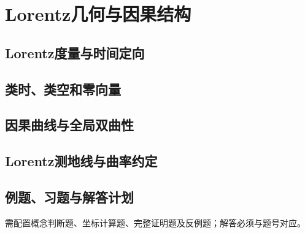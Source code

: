 \chapter{Lorentz几何与因果结构}
\label{ch:21-lorentz}

\section{Lorentz度量与时间定向}
\PlannedSection

\section{类时、类空和零向量}
\PlannedSection

\section{因果曲线与全局双曲性}
\PlannedSection

\section{Lorentz测地线与曲率约定}
\PlannedSection

\section{例题、习题与解答计划}
需配置概念判断题、坐标计算题、完整证明题及反例题；解答必须与题号对应。
